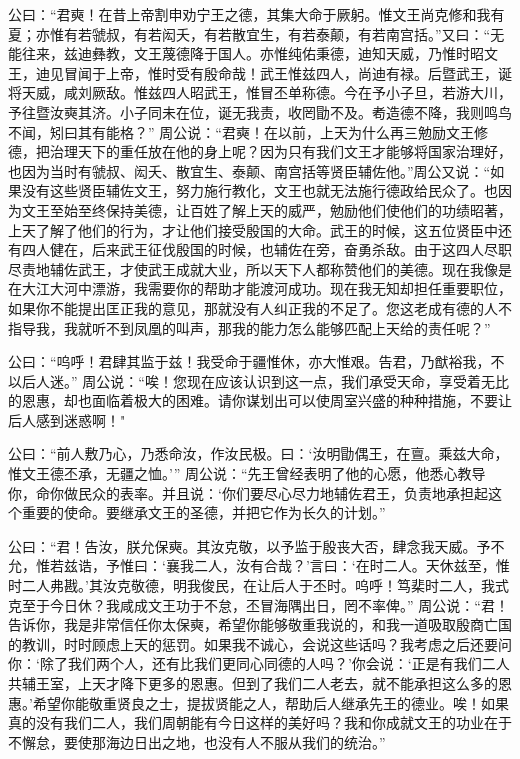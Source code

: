 \documentclass[a4paper,12pt,UTF8,twoside]{ctexbook}
\begin{document}
公曰：“君奭！在昔上帝割申劝宁王之德，其集大命于厥躬。惟文王尚克修和我有夏；亦惟有若虢叔，有若闳夭，有若散宜生，有若泰颠，有若南宫括。”又曰：“无能往来，兹迪彝教，文王蔑德降于国人。亦惟纯佑秉德，迪知天威，乃惟时昭文王，迪见冒闻于上帝，惟时受有殷命哉！武王惟兹四人，尚迪有禄。后暨武王，诞将天威，咸刘厥敌。惟兹四人昭武王，惟冒丕单称德。今在予小子旦，若游大川，予往暨汝奭其济。小子同未在位，诞无我责，收罔勖不及。耇造德不降，我则鸣鸟不闻，矧曰其有能格？”
周公说：“君奭！在以前，上天为什么再三勉励文王修德，把治理天下的重任放在他的身上呢？因为只有我们文王才能够将国家治理好，也因为当时有虢叔、闳夭、散宜生、泰颠、南宫括等贤臣辅佐他。”周公又说：“如果没有这些贤臣辅佐文王，努力施行教化，文王也就无法施行德政给民众了。也因为文王至始至终保持美德，让百姓了解上天的威严，勉励他们使他们的功绩昭著，上天了解了他们的行为，才让他们接受殷国的大命。武王的时候，这五位贤臣中还有四人健在，后来武王征伐殷国的时候，也辅佐在旁，奋勇杀敌。由于这四人尽职尽责地辅佐武王，才使武王成就大业，所以天下人都称赞他们的美德。现在我像是在大江大河中漂游，我需要你的帮助才能渡河成功。现在我无知却担任重要职位，如果你不能提出匡正我的意见，那就没有人纠正我的不足了。您这老成有德的人不指导我，我就听不到凤凰的叫声，那我的能力怎么能够匹配上天给的责任呢？”

公曰：“呜呼！君肆其监于兹！我受命于疆惟休，亦大惟艰。告君，乃猷裕我，不以后人迷。”
周公说：“唉！您现在应该认识到这一点，我们承受天命，享受着无比的恩惠，却也面临着极大的困难。请你谋划出可以使周室兴盛的种种措施，不要让后人感到迷惑啊！"

公曰：“前人敷乃心，乃悉命汝，作汝民极。曰：‘汝明勖偶王，在亶。乘兹大命，惟文王德丕承，无疆之恤。’”
周公说：“先王曾经表明了他的心愿，他悉心教导你，命你做民众的表率。并且说：‘你们要尽心尽力地辅佐君王，负责地承担起这个重要的使命。要继承文王的圣德，并把它作为长久的计划。”

公曰：“君！告汝，朕允保奭。其汝克敬，以予监于殷丧大否，肆念我天威。予不允，惟若兹诰，予惟曰：‘襄我二人，汝有合哉？’言曰：‘在时二人。天休兹至，惟时二人弗戡。’其汝克敬德，明我俊民，在让后人于丕时。呜呼！笃棐时二人，我式克至于今日休？我咸成文王功于不怠，丕冒海隅出日，罔不率俾。”
周公说：“君！告诉你，我是非常信任你太保奭，希望你能够敬重我说的，和我一道吸取殷商亡国的教训，时时顾虑上天的惩罚。如果我不诚心，会说这些话吗？我考虑之后还要问你：‘除了我们两个人，还有比我们更同心同德的人吗？’你会说：‘正是有我们二人共辅王室，上天才降下更多的恩惠。但到了我们二人老去，就不能承担这么多的恩惠。’希望你能敬重贤良之士，提拔贤能之人，帮助后人继承先王的德业。唉！如果真的没有我们二人，我们周朝能有今日这样的美好吗？我和你成就文王的功业在于不懈怠，要使那海边日出之地，也没有人不服从我们的统治。”
\end{document}

